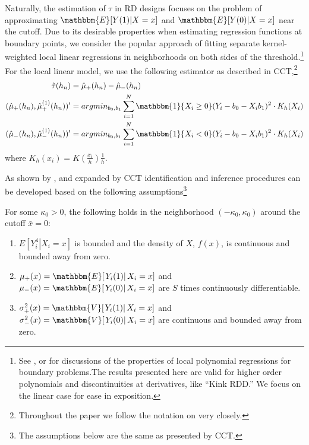 \documentclass[12pt,fleqn]{article}
\begin{document}
Naturally, the estimation of $\tau$ in RD designs focuses on the 
problem of approximating $\mathbbm{E}[Y(1)|X=x]$ and $\mathbbm{E}[Y(0)|X=x]$ 
near the cutoff. Due to its desirable properties when estimating regression 
functions at boundary points, we consider the popular approach of fitting 
separate kernel-weighted local linear regressions in neighborhoods on both 
sides of the threshold.\footnote{See \cite{HTV2001}, \cite{Porter03} or
\cite{FanGijbels92} for discussions of the properties of local polynomial 
regressions for boundary problems.The results presented here are valid for
higher order polynomials and discontinuities at derivatives, like ``Kink RDD.'' We focus on the linear case for ease in exposition.}
For the local linear model, we use the following estimator as described in 
CCT,\footnote{Throughout the paper we follow the notation on \cite{calonico2014} very closely.}
\begin{align*}
 \hat{\tau}(h_{n})&=\hat {\mu}_{+}(h_{n}) -\hat{\mu}_{-}(h_{n})\\
(\hat {\mu}_{+}(h_{n}),\hat {\mu}^{(1)}_{+}(h_{n}))'&= argmin_{b_{0},b_{1}} 
\sum_{i=1}^{N}\mathbbm{1}\{X_{i} \geq 0\}(Y_{i}-b_{0}-X_{i}b_{1})^{2} \cdot K_{h}(X_{i})\\
(\hat {\mu}_{-}(h_{n}),\hat {\mu}^{(1)}_{-}(h_{n}))' &= argmin_{b_{0},b_{1}}
\sum_{i=1}^{N}\mathbbm{1}\{X_{i} < 0\}(Y_{i}-b_{0}-X_{i}b_{1})^{2}\cdot K_{h}(X_{i})
\end{align*}
where $K_{h}(x_{i}) = K\left(\frac{x_{i}}{h}\right)\frac{1}{h}$.

As shown by \cite{HTV2001}, \cite{Porter03} and expanded by CCT 
identification and inference procedures can be developed based on the following 
assumptions\footnote{The assumptions below are the same as presented by CCT.}
\begin{assumption}\label{A1}
 For some $\kappa_{0} > 0$, the following holds in the neighborhood 
 $(-\kappa_{0},\kappa_{0})$ around the cutoff $ \bar{x}= 0$:
 \begin{enumerate}
  \item $E[\left.Y_{i}^{4}\right|X_{i}=x]$ is bounded and the density of $X$, 
  $f(x)$, is continuous and bounded away from zero.
  \item $\mu_{+}(x)=\mathbbm{E}[\left.Y_{i}(1)\right|X_{i}=x]$ and $\mu_{-}(x)=
  \mathbbm{E}[\left.Y_{i}(0)\right|X_{i}=x]$ are $S$ times continuously 
  differentiable.
  \item $\sigma^{2}_{+}(x)=\mathbbm{V}[\left.Y_{i}(1)\right|X_{i}=x]$ and 
  $\sigma^{2}_{-}(x)=\mathbbm{V}[\left.Y_{i}(0)\right|X_{i}=x]$ are continuous 
  and bounded away from zero.
 \end{enumerate}
\end{assumption}
\end{document}
